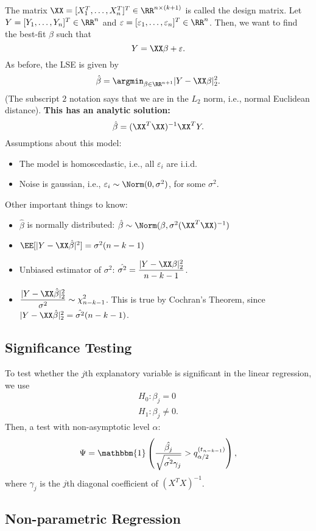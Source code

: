 The matrix $\XX = [X_1^T, \hdots, X_n^T]^T\in \RR^{n\times (k+1)}$ is called the \ac{design matrix}. Let $Y = [Y_1, \hdots, Y_n]^T\in \RR^n$ and $\varepsilon = [\varepsilon_1, \hdots, \varepsilon_n]^T\in \RR^n$. Then, we want to find the best-fit $\beta$ such that
\[Y = \XX\beta + \varepsilon.\]
As before, the LSE is given by
\[\hat{\beta} = \argmin_{\beta\in \RR^{n+1}}\vert Y-\XX\beta\vert^2_2.\]
(The subscript $2$ notation says that we are in the $L_2$ norm, i.e., normal Euclidean distance). 
\textbf{This has an analytic solution:}
\[\hat{\beta} = (\XX^T\XX)^{-1}\XX^TY.\]
Assumptions about this model:
\begin{itemize}
    \item The model is \ac{homoscedastic}, i.e., all $\varepsilon_i$ are i.i.d.
    \item Noise is gaussian, i.e., $\varepsilon_i\sim \Norm(0,\sigma^2)$, for some $\sigma^2$. 
\end{itemize}
Other important things to know:
\begin{itemize}
    \item $\hat{\beta}$ is normally distributed: $\hat{\beta}\sim \Norm(\beta, \sigma^2(\XX^T\XX)^{-1})$
    \item $\EE[\vert Y-\XX\hat{\beta}\vert^2] = \sigma^2(n-k-1)$
    \item Unbiased estimator of $\sigma^2$: $\displaystyle \hat{\sigma^2} = \frac{\vert Y-\XX\beta\vert^2_2}{n-k-1}$.
    \item $\displaystyle \frac{\vert Y-\XX\hat{\beta}\vert^2_2}{\sigma^2}\sim \chi_{n-k-1}^2$. This is true by Cochran's Theorem, since $\vert Y-\XX\hat{\beta}\vert^2_2=\hat{\sigma^2}(n-k-1)$. 
\end{itemize}

\subsection{Significance Testing}
To test whether the $j$th explanatory variable is significant in the linear regression, we use
\begin{align*}
    H_0: \beta_j = 0\\
    H_1: \beta_j\neq 0.
\end{align*}
Then, a test with non-asymptotic level $\alpha$:
\[\Psi = \mathbbm{1}\left(\frac{\hat{\beta_j}}{\sqrt{\hat{\sigma^2}\gamma_j}} > q_{\alpha/2}^{(t_{n-k-1})}\right),\]
where $\gamma_j$ is the $j$th diagonal coefficient of $(X^TX)^{-1}$. 

\subsection{Non-parametric Regression}

